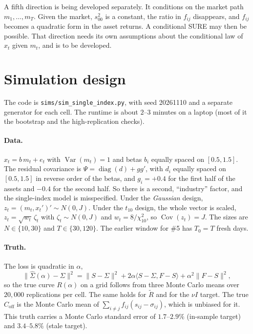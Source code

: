 \documentclass[11pt]{article}
\theoremstyle{remark}
\begin{document}
A fifth direction is being developed separately. It conditions on the market path $m_1, \dots, m_T$. Given the market, $s_{00}^2$ is a constant, the ratio in $f_{ij}$ disappears, and $f_{ij}$ becomes a quadratic form in the asset returns. A conditional SURE may then be possible. That direction needs its own assumptions about the conditional law of $x_t$ given $m_t$, and is to be developed.

\section{Simulation design}

The code is \texttt{sims/sim\_single\_index.py}, with seed 20261110 and a separate generator for each cell. The runtime is about $2$--$3$ minutes on a laptop (most of it the bootstrap and the high-replication checks).

\paragraph{Data.} $x_t = b\,m_t + e_t$ with $\operatorname{Var}(m_t) = 1$ and betas $b_i$ equally spaced on $[0.5, 1.5]$. The residual covariance is $\Psi = \operatorname{diag}(d) + gg'$, with $d_i$ equally spaced on $[0.5, 1.5]$ in reverse order of the betas, and $g_i = +0.4$ for the first half of the assets and $-0.4$ for the second half. So there is a second, ``industry'' factor, and the single-index model is misspecified. Under the \emph{Gaussian} design, $z_t = (m_t, x_t')' \sim N(0, J)$. Under the \emph{$t_{10}$} design, the whole vector is scaled, $z_t = \sqrt{w_t}\,\zeta_t$ with $\zeta_t \sim N(0,J)$ and $w_t = 8/\chi^2_{10}$, so $\operatorname{Cov}(z_t) = J$. The sizes are $N \in \{10, 30\}$ and $T \in \{30, 120\}$. The earlier window for \#5 has $T_0 = T$ fresh days.

\paragraph{Truth.} The loss is quadratic in $\alpha$,
\[
  \|\hat\Sigma(\alpha) - \Sigma\|^2 = \|S - \Sigma\|^2 + 2\alpha\langle S - \Sigma, F - S\rangle + \alpha^2\|F - S\|^2,
\]
so the true curve $R(\alpha)$ on a grid follows from three Monte Carlo means over $20{,}000$ replications per cell. The same holds for $\tilde R$ and for the $\nu I$ target. The true $C_{\mathrm{off}}$ is the Monte Carlo mean of $\sum_{i\ne j} f_{ij}(s_{ij} - \sigma_{ij})$, which is unbiased for it. This truth carries a Monte Carlo standard error of $1.7$--$2.9\%$ (in-sample target) and $3.4$--$5.8\%$ (stale target).
\end{document}
